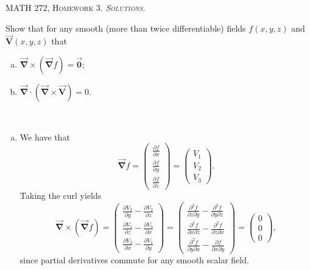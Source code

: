 \documentclass[12pt]{article} %
\newcommand{\grad}{\boldsymbol{\vec{\nabla}}}
\newcommand{\vecfieldV}{\boldsymbol{\vec{V}}}
\begin{document}
\begin{center}
   \textsc{\large MATH 272, Homework 3. \emph{Solutions}.}\\
\end{center}
\vspace{.5cm}


\begin{problem}
Show that for any smooth (more than twice differentiable) fields $f(x,y,z)$ and $\vecfieldV(x,y,z)$ that
\begin{enumerate}[(a)]
	\item $\grad \times \left(\grad f\right)=\boldsymbol{\vec{0}}$;
	\item $\grad \cdot \left(\grad \times \vecfieldV\right)=0$.
\end{enumerate}
\end{problem}
\begin{solution}~
    \begin{enumerate}[(a)]
        \item We have that 
        \[
        \grad f = \begin{pmatrix} \frac{\partial f}{\partial x} \\ \frac{\partial f}{\partial y} \\ \frac{\partial f}{\partial z}\end{pmatrix} = \begin{pmatrix} V_1 \\ V_2 \\ V_3 \end{pmatrix}.
        \]
        Taking the curl yields
        \[
        \grad \times \left(\grad f\right) = \begin{pmatrix} \frac{\partial V_3}{\partial y} - \frac{\partial V_2}{\partial z} \\ \frac{\partial V_1}{\partial z} - \frac{\partial V_3}{\partial x} \\ \frac{\partial V_2}{\partial x} - \frac{\partial V_1}{\partial y} \end{pmatrix} = 
        \begin{pmatrix} \frac{\partial^2 f}{\partial z\partial y} - \frac{\partial^2 f}{\partial y\partial z} \\ \frac{\partial^2 f}{\partial x\partial z} - \frac{\partial^2 f}{\partial z \partial x} \\ \frac{\partial^2 f}{\partial y\partial x} - \frac{\partial f}{\partial x\partial y} \end{pmatrix}= \begin{pmatrix} 0 \\ 0 \\ 0 \end{pmatrix},
        \]
        since partial derivatives commute for any smooth scalar field.
        

\end{enumerate}
\end{solution}
\end{document}
